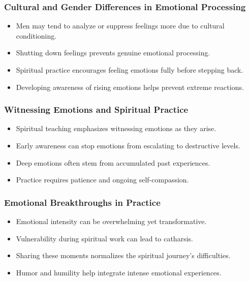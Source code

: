 \begin{frame}[fragile]\frametitle{Cultural and Gender Differences in Emotional Processing}
  \begin{itemize}
    \item Men may tend to analyze or suppress feelings more due to cultural conditioning.
    \item Shutting down feelings prevents genuine emotional processing.
    \item Spiritual practice encourages feeling emotions fully before stepping back.
    \item Developing awareness of rising emotions helps prevent extreme reactions.
  \end{itemize}
\end{frame}

\begin{frame}[fragile]\frametitle{Witnessing Emotions and Spiritual Practice}
  \begin{itemize}
    \item Spiritual teaching emphasizes witnessing emotions as they arise.
    \item Early awareness can stop emotions from escalating to destructive levels.
    \item Deep emotions often stem from accumulated past experiences.
    \item Practice requires patience and ongoing self-compassion.
  \end{itemize}
\end{frame}

\begin{frame}[fragile]\frametitle{Emotional Breakthroughs in Practice}
  \begin{itemize}
    \item Emotional intensity can be overwhelming yet transformative.
    \item Vulnerability during spiritual work can lead to catharsis.
    \item Sharing these moments normalizes the spiritual journey's difficulties.
    \item Humor and humility help integrate intense emotional experiences.
  \end{itemize}
\end{frame}

